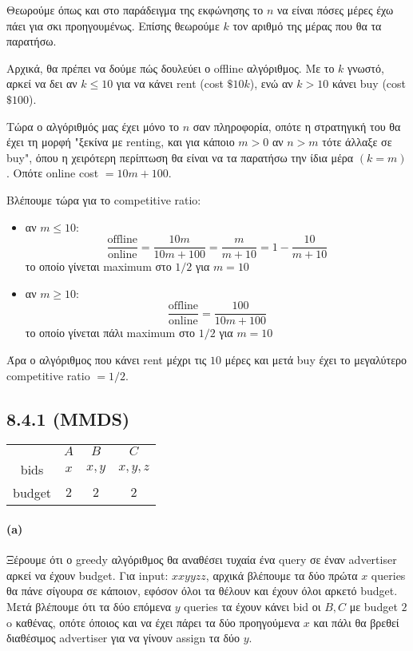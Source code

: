 \documentclass[a4paper,11pt]{article}
\begin{document}
Θεωρούμε όπως και στο παράδειγμα της εκφώνησης το $n$ να είναι πόσες μέρες έχω πάει για σκι προηγουμένως.
Επίσης θεωρούμε $k$ τον αριθμό της μέρας που θα τα παρατήσω.

Αρχικά, θα πρέπει να δούμε πώς δουλεύει ο offline αλγόριθμος.
Με το $k$ γνωστό, αρκεί να δει αν $k \leq 10$ για να κάνει rent (cost $\$10k$), ενώ αν $k > 10$ κάνει buy (cost $\$100$).

Τώρα ο αλγόριθμός μας έχει μόνο το $n$ σαν πληροφορία, οπότε η στρατηγική του θα έχει τη μορφή "ξεκίνα με renting, και για κάποιο $m>0$ αν $n>m$ τότε άλλαξε σε buy", όπου η χειρότερη περίπτωση θα είναι να τα παρατήσω την ίδια μέρα $(k=m)$.
Οπότε online cost $=10m+100$.

Βλέπουμε τώρα για το competitive ratio:
\begin{itemize}
	\item αν $m \leq 10$:
		\[
			\frac{\text{offline}}{\text{online}} = \frac{10m}{10m+100} = \frac{m}{m+10} = 1 - \frac{10}{m+10}
		\]
		το οποίο γίνεται maximum στο $1/2$ για $m=10$
	\item αν $m \geq 10$:
		\[
			\frac{\text{offline}}{\text{online}} = \frac{100}{10m+100}
		\]
		το οποίο γίνεται πάλι maximum στο $1/2$ για $m=10$
\end{itemize}
Άρα ο αλγόριθμος που κάνει rent μέχρι τις $10$ μέρες και μετά buy έχει το μεγαλύτερο competitive ratio $=1/2$.

\subsection*{8.4.1 (MMDS)}

\begin{center}
	\begin{tabular}{| c || c | c | c |}
		\hline
		& $A$ & $B$ & $C$ \\ \hhline{|=#=|=|=|}
		bids & $x$ & $x,y$ & $x,y,z$ \\ \hline
		budget & $2$ & $2$ & $2$ \\ \hline
	\end{tabular}
\end{center}

\paragraph{(a)} Ξέρουμε ότι ο greedy αλγόριθμος θα αναθέσει τυχαία ένα query σε έναν advertiser αρκεί να έχουν budget.
Για input: $xxyyzz$, αρχικά βλέπουμε τα δύο πρώτα $x$ queries θα πάνε σίγουρα σε κάποιον, εφόσον όλοι τα θέλουν και έχουν όλοι αρκετό budget.
Μετά βλέπουμε ότι τα δύο επόμενα $y$ queries τα έχουν κάνει bid οι $B,C$ με budget $2$ o καθένας, οπότε όποιος και να έχει πάρει τα δύο προηγούμενα $x$ και πάλι θα βρεθεί διαθέσιμος advertiser για να γίνουν assign τα δύο $y$.
\end{document}
